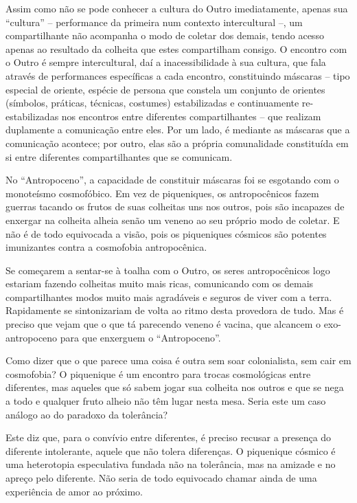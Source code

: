 Assim como não se pode conhecer a cultura do Outro imediatamente, apenas sua \enquote{cultura} -- performance da primeira num contexto intercultural --, um compartilhante não acompanha o modo de coletar dos demais, tendo acesso apenas ao resultado da colheita que estes compartilham consigo. O encontro com o Outro é sempre intercultural, daí a inacessibilidade à sua cultura, que fala através de performances específicas a cada encontro, constituindo máscaras -- tipo especial de oriente, espécie de persona que constela um conjunto de orientes (símbolos, práticas, técnicas, costumes) estabilizadas e continuamente re-estabilizadas nos encontros entre diferentes compartilhantes -- que realizam duplamente a comunicação entre eles. Por um lado, é mediante as máscaras que a comunicação acontece; por outro, elas são a própria comunalidade constituída em si entre diferentes compartilhantes que se comunicam.

No \enquote{Antropoceno}, a capacidade de constituir máscaras foi se esgotando com o monoteísmo cosmofóbico. Em vez de piqueniques, os antropocênicos fazem guerras tacando os frutos de suas colheitas uns nos outros, pois são incapazes de enxergar na colheita alheia senão um veneno ao seu próprio modo de coletar. E não é de todo equivocada a visão, pois os piqueniques cósmicos são potentes imunizantes contra a cosmofobia antropocênica.

Se começarem a sentar-se à toalha com o Outro, os seres antropocênicos logo estariam fazendo colheitas muito mais ricas, comunicando com os demais compartilhantes modos muito mais agradáveis e seguros de viver com a terra. Rapidamente se sintonizariam de volta ao ritmo desta provedora de tudo. Mas é preciso que vejam que o que tá parecendo veneno é vacina, que alcancem o exo-antropoceno para que enxerguem o \enquote{Antropoceno}.


Como dizer que o que parece uma coisa é outra sem soar colonialista, sem cair em cosmofobia? O piquenique é um encontro para trocas cosmológicas entre diferentes, mas aqueles que só sabem jogar sua colheita nos outros e que se nega a todo e qualquer fruto alheio não têm lugar nesta mesa. Seria este um caso análogo ao do paradoxo da tolerância?

Este diz que, para o convívio entre diferentes, é preciso recusar a presença do diferente intolerante, aquele que não tolera diferenças. O piquenique cósmico é uma heterotopia especulativa fundada não  na tolerância, mas na amizade e no apreço pelo diferente. Não seria de todo equivocado chamar ainda de uma experiência de amor ao próximo.

